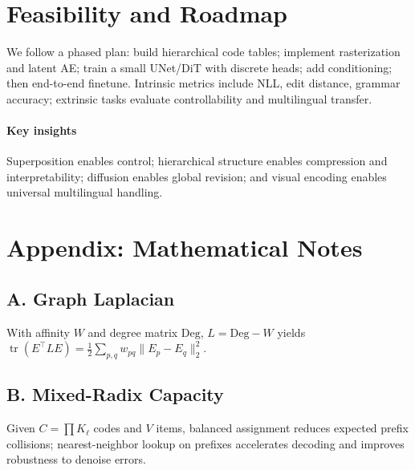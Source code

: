 \documentclass[11pt]{article}
\begin{document}
\section{Feasibility and Roadmap}
We follow a phased plan: build hierarchical code tables; implement rasterization and latent AE; train a small UNet/DiT with discrete heads; add conditioning; then end-to-end finetune. Intrinsic metrics include NLL, edit distance, grammar accuracy; extrinsic tasks evaluate controllability and multilingual transfer.

\paragraph{Key insights} Superposition enables control; hierarchical structure enables compression and interpretability; diffusion enables global revision; and visual encoding enables universal multilingual handling.

\section*{Appendix: Mathematical Notes}
\subsection*{A. Graph Laplacian}
With affinity $W$ and degree matrix $\mathrm{Deg}$, $L{=}\mathrm{Deg}{-}W$ yields $\operatorname{tr}(E^\top L E){=}\tfrac{1}{2}\sum_{p,q}w_{pq}\|E_p{-}E_q\|_2^2$.

\subsection*{B. Mixed-Radix Capacity}
Given $C{=}\prod K_\ell$ codes and $V$ items, balanced assignment reduces expected prefix collisions; nearest-neighbor lookup on prefixes accelerates decoding and improves robustness to denoise errors.
\end{document}
